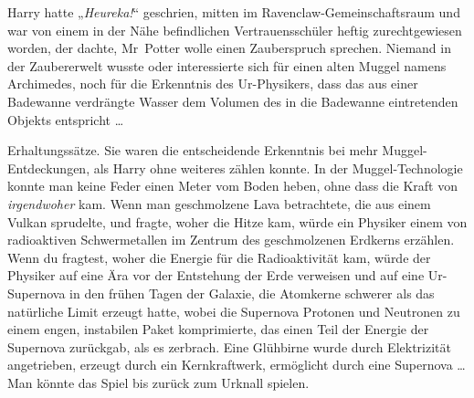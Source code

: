 Harry hatte
„\emph{Heureka!}“ geschrien, mitten im Ravenclaw-Gemeinschaftsraum und war von einem in der Nähe befindlichen Vertrauensschüler heftig zurechtgewiesen worden, der dachte, Mr~Potter wolle einen Zauberspruch sprechen. Niemand in der Zaubererwelt wusste oder interessierte sich für einen alten Muggel namens Archimedes, noch für die Erkenntnis des Ur-Physikers, dass das aus einer Badewanne verdrängte Wasser dem Volumen des in die Badewanne eintretenden Objekts entspricht …

Erhaltungssätze. Sie waren die entscheidende Erkenntnis bei mehr Muggel-Entdeckungen, als Harry ohne weiteres zählen konnte. In der Muggel-Technologie konnte man keine Feder einen Meter vom Boden heben, ohne dass die Kraft von \emph{irgendwoher} kam. Wenn man geschmolzene Lava betrachtete, die aus einem Vulkan sprudelte, und fragte, woher die Hitze kam, würde ein Physiker einem von radioaktiven Schwermetallen im Zentrum des geschmolzenen Erdkerns erzählen. Wenn du fragtest, woher die Energie für die Radioaktivität kam, würde der Physiker auf eine Ära vor der Entstehung der Erde verweisen und auf eine Ur-Supernova in den frühen Tagen der Galaxie, die Atomkerne schwerer als das natürliche Limit erzeugt hatte, wobei die Supernova Protonen und Neutronen zu einem engen, instabilen Paket komprimierte, das einen Teil der Energie der Supernova zurückgab, als es zerbrach. Eine Glühbirne wurde durch Elektrizität angetrieben, erzeugt durch ein Kernkraftwerk, ermöglicht durch eine Supernova … Man könnte das Spiel bis zurück zum Urknall spielen.

